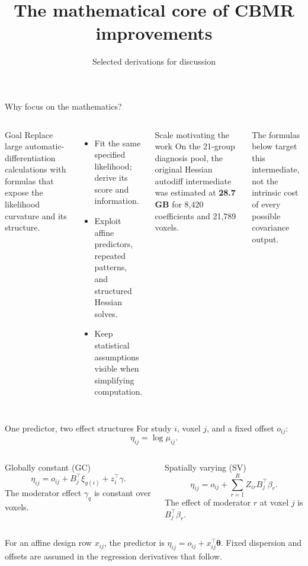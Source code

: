 \documentclass[aspectratio=169,10pt]{beamer}
\title[CBMR math improvements]{The mathematical core of CBMR improvements}
\subtitle{Selected derivations for discussion}
\author{}
\institute{Based on the expanded CBMR derivations}
\date{}
\newcommand{\btheta}{\boldsymbol{\theta}}
\begin{document}
\begin{frame}[plain]
  \titlepage
\end{frame}

\begin{frame}{Why focus on the mathematics?}
\begin{columns}[T,onlytextwidth]
\begin{block}{Goal}
Replace large automatic-differentiation calculations with formulas that expose
the likelihood curvature and its structure.
\end{block}
\begin{itemize}
  \item Fit the same specified likelihood; derive its score and information.
  \item Exploit affine predictors, repeated patterns, and structured Hessian solves.
  \item Keep statistical assumptions visible when simplifying computation.
\end{itemize}
\begin{block}{Scale motivating the work}
On the 21-group diagnosis pool, the original Hessian autodiff intermediate was
estimated at \textbf{28.7 GB} for 8,420 coefficients and 21,789 voxels.
\end{block}
\vspace{2mm}
\small The formulas below target this intermediate, not the intrinsic cost of
every possible covariance output.
\end{columns}
\end{frame}

\begin{frame}{One predictor, two effect structures}
For study $i$, voxel $j$, and a fixed offset $o_{ij}$:
\[
\eta_{ij}=\log\mu_{ij}.
\]
\begin{columns}[T,onlytextwidth]
\begin{block}{Globally constant (GC)}
\[
\eta_{ij}=o_{ij}+B_j^\top\xi_{g(i)}+z_i^\top\gamma.
\]
The moderator effect $\gamma_q$ is constant over voxels.
\end{block}
\begin{block}{Spatially varying (SV)}
\[
\eta_{ij}=o_{ij}+\sum_{r=1}^R Z_{ir}B_j^\top\beta_r.
\]
The effect of moderator $r$ at voxel $j$ is $B_j^\top\beta_r$.
\end{block}
\end{columns}
\vspace{1mm}
\small For an affine design row $x_{ij}$, the predictor is
$\eta_{ij}=o_{ij}+x_{ij}^\top\btheta$. Fixed dispersion and offsets are
assumed in the regression derivatives that follow.
\end{frame}
\end{document}
